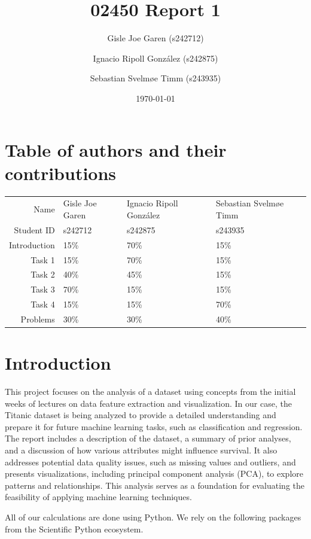 \documentclass[twoside,11pt]{article}
\title{02450 Report 1}
\author{{Gisle Joe Garen (s242712)} \and {Ignacio Ripoll González (s242875)} \and {Sebastian Svelmøe Timm (s243935)}}
\date{\today}
\begin{document}
\maketitle

\section*{Table of authors and their contributions}

\begin{center}
	\begin{tabular}{| r | l | l | l |}
		\hline
				Name & Gisle Joe Garen & Ignacio Ripoll González & Sebastian Svelmøe Timm\\
		Student ID   & s242712 & s242875 & s243935\\
		\hline
		Introduction & 15\% & 70\% & 15\%\\
			  Task 1 & 15\% & 70\% & 15\%\\
			  Task 2 & 40\% & 45\% & 15\%\\
			  Task 3 & 70\% & 15\% & 15\%\\
			  Task 4 & 15\% & 15\% & 70\%\\
			Problems & 30\% & 30\% & 40\%\\
		\hline
	\end{tabular}
\end{center}


\section*{Introduction}

This project focuses on the analysis of a dataset using concepts from the initial weeks of lectures on data feature extraction and visualization. In our case, the Titanic dataset is being analyzed to provide a detailed understanding and prepare it for future machine learning tasks, such as classification and regression. The report includes a description of the dataset, a summary of prior analyses, and a discussion of how various attributes might influence survival. It also addresses potential data quality issues, such as missing values and outliers, and presents visualizations, including principal component analysis (PCA), to explore patterns and relationships. This analysis serves as a foundation for evaluating the feasibility of applying machine learning techniques.

All of our calculations are done using Python. We rely on the following packages from the Scientific Python ecosystem.
\end{document}

